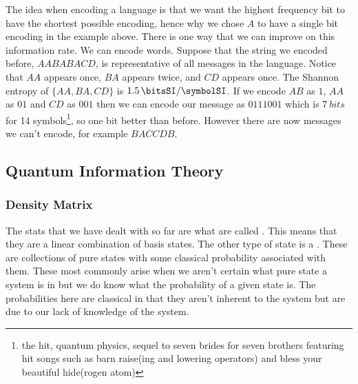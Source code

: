     The idea when encoding a language is that we want the highest frequency bit to have the shortest possible encoding, hence why we chose \(A\) to have a single bit encoding in the example above.
    There is one way that we can improve on this information rate.
    We can encode words.
    Suppose that the string we encoded before, \(AABABACD\), is representative of all messages in the language.
    Notice that \(AA\) appears once, \(BA\) appears twice, and \(CD\) appears once.
    The Shannon entropy of \(\{AA, BA, CD\}\) is \(\SI{1.5}{\bitsSI/\symbolSI}\).
    If we encode \(AB\) as \(1\), \(AA\) as \(01\) and \(CD\) as \(001\) then we can encode our message as \(0111001\) which is \(\SI{7}{bits}\) for 14 symbols\footnote{the hit, quantum physics, sequel to seven brides for seven brothers featuring hit songs such as barn raise(ing and lowering operators) and bless your beautiful hide(rogen atom)}, so one bit better than before.
    However there are now messages we can't encode, for example \(BACCDB\).
    
    \subsection{Quantum Information Theory}
    \subsubsection{Density Matrix}\label{sec:density matrix}
    The stats that we have dealt with so far are what are called .
    This means that they are a linear combination of basis states.
    The other type of state is a .
    These are collections of pure states with some classical probability associated with them.
    These most commonly arise when we aren't certain what pure state a system is in but we do know what the probability of a given state is.
    The probabilities here are classical in that they aren't inherent to the system but are due to our lack of knowledge of the system.
    
